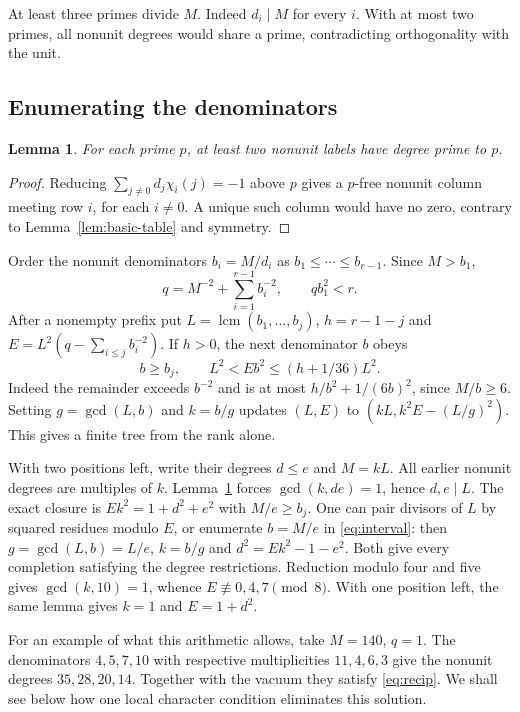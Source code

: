 \documentclass[11pt]{amsart}
\numberwithin{equation}{section}
\newtheorem{lemma}[theorem]{Lemma}
\DeclareMathOperator{\lcm}{lcm}
\begin{document}
At least three primes divide $M$. Indeed $d_i\mid M$ for every $i$.
With at most two primes, all nonunit degrees would share a prime,
contradicting orthogonality with the unit.

\subsection{Enumerating the denominators}
\begin{lemma}\label{lem:deletion}
For each prime $p$, at least two nonunit labels have degree prime to $p$.
\end{lemma}
\begin{proof}
Reducing $\sum_{j\ne0}d_j\chi_i(j)=-1$ above $p$ gives a $p$-free nonunit
column meeting row $i$, for each $i\ne0$. A unique such column would have
no zero, contrary to Lemma~\ref{lem:basic-table} and symmetry.
\end{proof}

Order the nonunit denominators $b_i=M/d_i$ as $b_1\le\cdots\le b_{r-1}$.
Since $M>b_1$,
\begin{equation}\label{eq:recip}
 q=M^{-2}+\sum_{i=1}^{r-1}b_i^{-2},\qquad q b_1^2<r .
\end{equation}
After a nonempty prefix put $L=\lcm(b_1,\dots,b_j)$, $h=r-1-j$ and
$E=L^2(q-\sum_{i\le j}b_i^{-2})$. If $h>0$, the next denominator $b$ obeys
\begin{equation}\label{eq:interval}
 b\ge b_j,\qquad L^2<Eb^2\le(h+1/36)L^2 .
\end{equation}
Indeed the remainder exceeds $b^{-2}$ and is at most $h/b^2+1/(6b)^2$,
since $M/b\ge6$. Setting $g=\gcd(L,b)$ and $k=b/g$ updates $(L,E)$ to
$(kL,k^2E-(L/g)^2)$. This gives a finite tree from the rank alone.

With two positions left, write their degrees $d\le e$ and $M=kL$. All
earlier nonunit degrees are multiples of $k$. Lemma~\ref{lem:deletion}
forces $\gcd(k,de)=1$, hence $d,e\mid L$. The exact closure is
$Ek^2=1+d^2+e^2$ with $M/e\ge b_j$. One can pair divisors of $L$ by
squared residues modulo $E$, or enumerate $b=M/e$ in \eqref{eq:interval}:
then $g=\gcd(L,b)=L/e$, $k=b/g$ and $d^2=Ek^2-1-e^2$. Both give every
completion satisfying the degree restrictions. Reduction modulo four and
five gives $\gcd(k,10)=1$, whence $E\not\equiv0,4,7\pmod8$.
With one position left, the same lemma gives $k=1$ and $E=1+d^2$.

For an example of what this arithmetic allows, take $M=140$, $q=1$.
The denominators $4,5,7,10$ with respective multiplicities $11,4,6,3$
give the nonunit degrees $35,28,20,14$. Together with the vacuum they
satisfy \eqref{eq:recip}. We shall see below how one local character
condition eliminates this solution.
\end{document}
